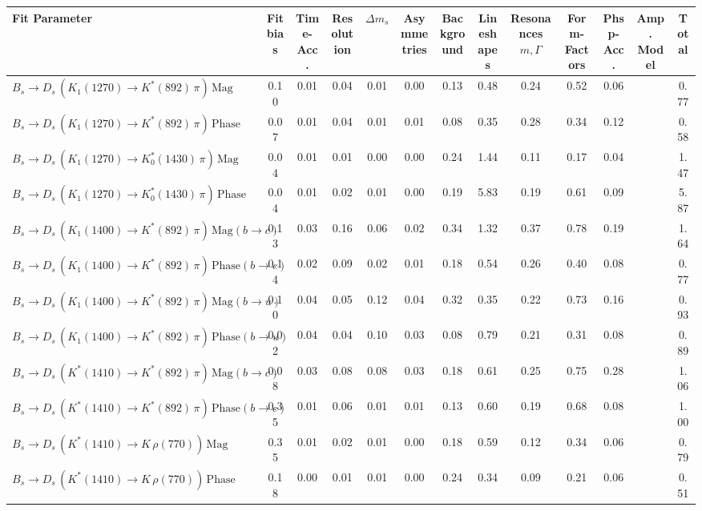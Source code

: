 \begin{tabular}{l  c  c  c  c  c  c  c  c  c  c  c  | c }
\hline
\hline
Fit Parameter & Fit bias & Time-Acc. & Resolution & $\Delta m_{s}$ & Asymmetries & Background & Lineshapes & Resonances $m,\Gamma$ & Form-Factors & Phsp-Acc. & Amp. Model &  Total  \\ 
\hline
$B_s \to D_s \, ( K_1(1270) \to K^{*}(892) \, \pi ) \, \text{Mag}$ & 0.10 & 0.01 & 0.04 & 0.01 & 0.00 & 0.13 & 0.48 & 0.24 & 0.52 & 0.06 &  & 0.77 \\ 
$B_s \to D_s \, ( K_1(1270) \to K^{*}(892) \, \pi ) \, \text{Phase}$ & 0.07 & 0.01 & 0.04 & 0.01 & 0.01 & 0.08 & 0.35 & 0.28 & 0.34 & 0.12 &  & 0.58 \\ 
$B_s \to D_s \, ( K_1(1270) \to K^{*}_{0}(1430) \, \pi ) \, \text{Mag} $ & 0.04 & 0.01 & 0.01 & 0.00 & 0.00 & 0.24 & 1.44 & 0.11 & 0.17 & 0.04 &  & 1.47 \\ 
$B_s \to D_s \, ( K_1(1270) \to K^{*}_{0}(1430) \, \pi ) \, \text{Phase} $ & 0.04 & 0.01 & 0.02 & 0.01 & 0.00 & 0.19 & 5.83 & 0.19 & 0.61 & 0.09 &  & 5.87 \\ 
$B_s \to D_s \, ( K_1(1400) \to K^{*}(892) \, \pi ) \, \text{Mag} (b \to c)$ & 0.13 & 0.03 & 0.16 & 0.06 & 0.02 & 0.34 & 1.32 & 0.37 & 0.78 & 0.19 &  & 1.64 \\ 
$B_s \to D_s \, ( K_1(1400) \to K^{*}(892) \, \pi ) \, \text{Phase} (b \to c)$ & 0.14 & 0.02 & 0.09 & 0.02 & 0.01 & 0.18 & 0.54 & 0.26 & 0.40 & 0.08 &  & 0.77 \\ 
$B_s \to D_s \, ( K_1(1400) \to K^{*}(892) \, \pi ) \, \text{Mag} (b \to u)$ & 0.10 & 0.04 & 0.05 & 0.12 & 0.04 & 0.32 & 0.35 & 0.22 & 0.73 & 0.16 &  & 0.93 \\ 
$B_s \to D_s \, ( K_1(1400) \to K^{*}(892) \, \pi ) \, \text{Phase} (b \to u)$ & 0.02 & 0.04 & 0.04 & 0.10 & 0.03 & 0.08 & 0.79 & 0.21 & 0.31 & 0.08 &  & 0.89 \\ 
$B_s \to D_s \, ( K^{*}(1410) \to K^{*}(892) \, \pi ) \, \text{Mag} (b \to c)$ & 0.08 & 0.03 & 0.08 & 0.08 & 0.03 & 0.18 & 0.61 & 0.25 & 0.75 & 0.28 &  & 1.06 \\ 
$B_s \to D_s \, ( K^{*}(1410) \to K^{*}(892) \, \pi ) \, \text{Phase} (b \to c)$ & 0.35 & 0.01 & 0.06 & 0.01 & 0.01 & 0.13 & 0.60 & 0.19 & 0.68 & 0.08 &  & 1.00 \\ 
$B_s \to D_s \, ( K^{*}(1410) \to K \, \rho(770) ) \, \text{Mag}$ & 0.35 & 0.01 & 0.02 & 0.01 & 0.00 & 0.18 & 0.59 & 0.12 & 0.34 & 0.06 &  & 0.79 \\ 
$B_s \to D_s \, ( K^{*}(1410) \to K \, \rho(770) ) \, \text{Phase}$ & 0.18 & 0.00 & 0.01 & 0.01 & 0.00 & 0.24 & 0.34 & 0.09 & 0.21 & 0.06 &  & 0.51 \\ 

\end{tabular}
